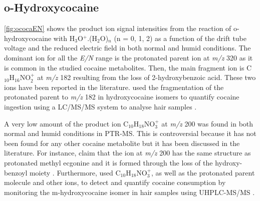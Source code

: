 \subsection{o-Hydroxycocaine}

\autoref{fig:ococaEN} shows the product ion signal intensities from the reaction of o-hydroxycocaine with H$_3$O$^+$.(H$_2$O)$_n$ (n = 0, 1, 2) as a function of the drift tube voltage and the reduced electric field in both normal and humid conditions.
%
The dominant ion for all the \textit{E/N} range is the protonated parent ion at \textit{m/z} 320 as it is common in the studied cocaine metabolites.
%
Then, the main fragment ion is C$_{10}$H$_{16}$NO$_2^+$ at \textit{m/z} 182 resulting from the loss of 2-hydroxybenzoic acid.
%
These two ions have been reported in the literature. 
%
\citeauthor{schaffer2016analysis}  used the fragmentation of the protonated parent to \textit{m/z} 182 in hydroxycocaine isomers to quantify cocaine ingestion using a LC/MS/MS system to analyse hair samples  \cite{schaffer2016analysis}.
%

A very low amount of the product ion C$_{10}$H$_{18}$NO$_3^+$ at \textit{m/z} 200 was found in both normal and humid conditions in PTR-MS.
%
This  is controversial because it has not been found for any other cocaine metabolite but it has been discussed in the literature.
%
For instance, \citeauthor{musshoff2018determination} claim that the ion at \textit{m/z} 200 has the same structure as protonated methyl ecgonine and it is formed through the loss of the hydroxy-benzoyl moiety \cite{musshoff2018determination}.
%
Furthermore, \citeauthor{minoli2019analysis} used C$_{10}$H$_{18}$NO$_3^+$, as well as the protonated parent molecule and other ions, to detect and quantify cocaine consumption by monitoring the m-hydroxycocaine isomer in hair samples using UHPLC-MS/MS  \cite{minoli2019analysis}.
%


%
%


